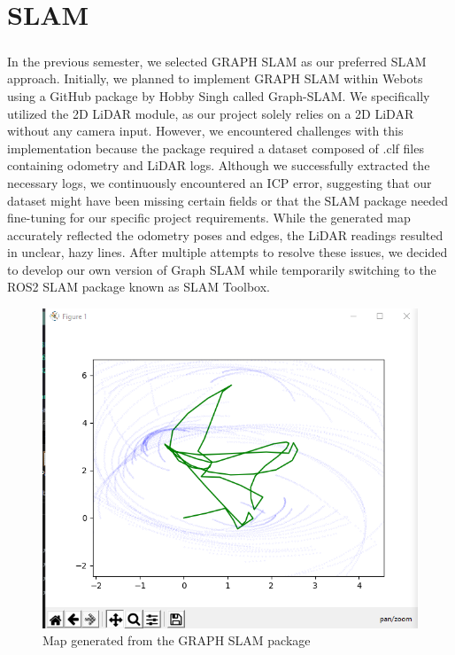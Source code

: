 \chapter{SLAM}

\paragraph*{}
In the previous semester, we selected GRAPH SLAM as our preferred SLAM approach. Initially, we planned to implement GRAPH SLAM within Webots using a GitHub package by Hobby Singh called Graph-SLAM. We specifically utilized the 2D LiDAR module, as our project solely relies on a 2D LiDAR without any camera input. However, we encountered challenges with this implementation because the package required a dataset composed of .clf files containing odometry and LiDAR logs. Although we successfully extracted the necessary logs, we continuously encountered an ICP error, suggesting that our dataset might have been missing certain fields or that the SLAM package needed fine-tuning for our specific project requirements. While the generated map accurately reflected the odometry poses and edges, the LiDAR readings resulted in unclear, hazy lines. After multiple attempts to resolve these issues, we decided to develop our own version of Graph SLAM while temporarily switching to the ROS2 SLAM package known as SLAM Toolbox.

\begin{figure} [H]
    \centering
    \includegraphics[width=0.5\linewidth]{assets/images/slam/graph_slam.png}
    \caption{Map generated from the GRAPH SLAM package}
    \label{fig:graph_slam_map}
\end{figure}


